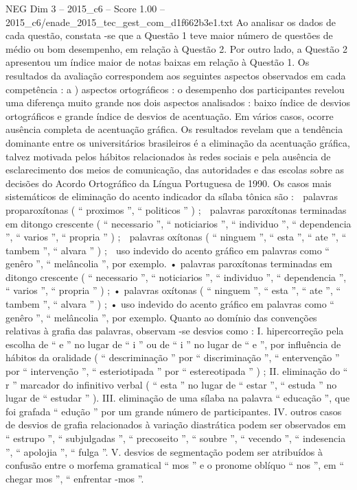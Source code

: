 \begin{textsample}{NEG Dim 3 – 2015\_c6 – Score 1.00 – 2015\_c6/enade\_2015\_tec\_gest\_com\_d1f662b3e1.txt}
Ao analisar os dados de cada questão, constata -se que a Questão 1 teve maior número de questões de médio ou bom desempenho, em relação à Questão 2.
Por outro lado, a Questão 2 apresentou um índice maior de notas baixas em relação à Questão 1.
Os resultados da avaliação correspondem aos seguintes aspectos observados em cada competência : a ) aspectos ortográficos : o desempenho dos participantes revelou uma diferença muito grande nos dois aspectos analisados : baixo índice de desvios ortográficos e grande índice de desvios de acentuação.
Em vários casos, ocorre ausência completa de acentuação gráfica.
Os resultados revelam que a tendência dominante entre os universitários brasileiros é a eliminação da acentuação gráfica, talvez motivada pelos hábitos relacionados às redes sociais e pela ausência de esclarecimento dos meios de comunicação, das autoridades e das escolas sobre as decisões do Acordo Ortográfico da Língua Portuguesa de 1990.
Os casos mais sistemáticos de eliminação do acento indicador da sílaba tônica são :  palavras proparoxítonas ( “ proximos ”, “ politicos ” ) ;  palavras paroxítonas terminadas em ditongo crescente ( “ necessario ”, “ noticiarios ”, “ individuo ”, “ dependencia ”, “ varios ”, “ propria ” ) ;  palavras oxítonas ( “ ninguem ”, “ esta ”, “ ate ”, “ tambem ”, “ alvara ” ) ;  uso indevido do acento gráfico em palavras como “ genêro ”, “ melâncolia ”, por exemplo. • palavras paroxítonas terminadas em ditongo crescente ( “ necessario ”, “ noticiarios ”, “ individuo ”, “ dependencia ”, “ varios ”, “ propria ” ) ; • palavras oxítonas ( “ ninguem ”, “ esta ”, “ ate ”, “ tambem ”, “ alvara ” ) ; • uso indevido do acento gráfico em palavras como “ genêro ”, “ melâncolia ”, por exemplo.
Quanto ao domínio das convenções relativas à grafia das palavras, observam -se desvios como : I. hipercorreção pela escolha de “ e ” no lugar de “ i ” ou de “ i ” no lugar de “ e ”, por influência de hábitos da oralidade ( “ descriminação ” por “ discriminação ”, “ entervenção ” por “ intervenção ”, “ esteriotipada ” por “ estereotipada ” ) ; II. eliminação do “ r ” marcador do infinitivo verbal ( “ esta ” no lugar de “ estar ”, “ estuda ” no lugar de “ estudar ” ).
III. eliminação de uma sílaba na palavra “ educação ”, que foi grafada “ edução ” por um grande número de participantes.
IV. outros casos de desvios de grafia relacionados à variação diastrática podem ser observados em “ estrupo ”, “ subjulgadas ”, “ precoseito ”, “ soubre ”, “ vecendo ”, “ indesencia ”, “ apolojia ”, “ fulga ”.
V. desvios de segmentação podem ser atribuídos à confusão entre o morfema gramatical “ mos ” e o pronome oblíquo “ nos ”, em “ chegar mos ”, “ enfrentar -mos ”.

\end{textsample}
